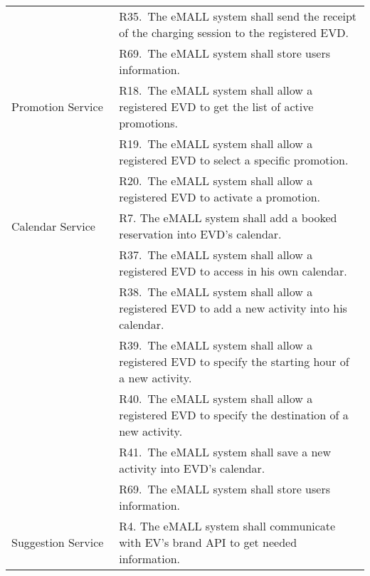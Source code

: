 \begin{center}
\begin{longtable}{p{0.3\linewidth}p{0.7\linewidth}}
        & R35.\ The eMALL system shall send the receipt of the charging session to the registered EVD.                                                    \\
        & R69.\ The eMALL system shall store users information.                                                                                           \\
        \hline
        Promotion Service                      & R18.\ The eMALL system shall allow a registered EVD to get the list of active promotions.                                                       \\
        & R19.\ The eMALL system shall allow a registered EVD to select a specific promotion.                                                             \\
        & R20.\ The eMALL system shall allow a registered EVD to activate a promotion.                                                                    \\
        \hline
        Calendar Service                       & R7. The eMALL system shall add a booked reservation into EVD’s calendar.                                                                        \\
        & R37.\ The eMALL system shall allow a registered EVD to access in his own calendar.                                                              \\
        & R38.\ The eMALL system shall allow a registered EVD to add a new activity into his calendar.                                                    \\
        & R39.\ The eMALL system shall allow a registered EVD to specify the starting hour of a new activity.                                             \\
        & R40.\ The eMALL system shall allow a registered EVD to specify the destination of a new activity.                                               \\
        & R41.\ The eMALL system shall save a new activity into EVD’s calendar.                                                                           \\
        & R69.\ The eMALL system shall store users information.                                                                                           \\
        \hline
        Suggestion Service                     & R4. The eMALL system shall communicate with EV’s brand API to get needed information.                                                           \\

\end{longtable}
\end{center}
